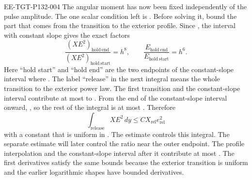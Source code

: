 \begin{EESegment}{EE-TGT-P132-004}
The angular moment has now been fixed independently of the pulse amplitude. The one scalar
condition left is . Before solving it, bound the part
that comes from the transition to the exterior profile. Since
, the interval with constant slope
 gives the exact factors
\begin{equation}
\frac{(XE^2)_{\mathrm{hold\ end}}}{(XE^2)_{\mathrm{hold\ start}}}=h^8,
\qquad
\frac{E_{\mathrm{hold\ end}}}{E_{\mathrm{hold\ start}}}=h^6.
\tag{A.17}\label{eq:A.17}
\end{equation}
Here ``hold start'' and ``hold end'' are the two endpoints of the constant-slope interval
where . The label ``release'' in the next integral means the
whole transition to the exterior power law. The first transition and the constant-slope
interval contribute at most
 to
. From the end of the constant-slope interval onward,
, so the rest of the integral is at most
. Therefore
\begin{equation}
\int_{\mathrm{release}}XE^2\,dy\le CX_{\mathrm{rel}}e_{\mathrm{rel}}^2
\tag{A.18}\label{eq:A.18}
\end{equation}
with a constant that is uniform in . The
 estimate controls this integral. The separate
 estimate will later control the ratio
 near the outer endpoint. The profile interpolation
and the constant-slope interval after it contribute at most
. The first
 derivatives satisfy the same bounds because the exterior
transition is uniform and the earlier logarithmic shapes have bounded derivatives.
\end{EESegment}
\par
